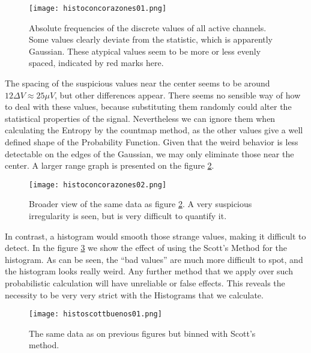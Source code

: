 \documentclass[10pt]{article}
\begin{document}
\begin{figure}
  \begin{center}
    \texttt{[image: histoconcorazones01.png]}
    \end{center}
 \caption{Absolute frequencies of the discrete values of all active channels.
   Some values clearly deviate from the statistic, which is apparently
   Gaussian. These atypical values seem to be more or less
   evenly spaced, indicated by red marks here.}\label{histocountmap1}
\end{figure}

The spacing of the suspicious values near the center seems to be
around $12 \Delta V \approx 25 \mu V$, but other differences appear.
There seems no sensible way of how to deal with these values, because
substituting them randomly could alter the statistical properties of the
signal. Nevertheless we can ignore them when calculating the Entropy
by the countmap method, as the other values give a well defined shape
of the Probability Function. Given that the weird behavior is less
detectable on the edges of the Gaussian, we may only eliminate those
near the center. A larger range graph is presented on the figure
\ref{histocountmap2}.


\begin{figure}
  \begin{center}
 \texttt{[image: histoconcorazones02.png]}   
  \end{center}
 
 \caption{Broader view of the same data as figure \ref{histocountmap2}.
   A very suspicious irregularity is seen, but is very difficult to
 quantify it.}
 \label{histocountmap2}   
\end{figure}

In contrast, a histogram would smooth those strange values, making it
difficult to detect. In the figure \ref{histoscott01} we show the
effect of using the Scott's Method for the histogram. As can be seen,
the ``bad values'' are much more difficult to spot, and the
histogram looks really weird. Any further method that we apply over such
probabilistic calculation will have unreliable or false effects. This reveals
the necessity to be very very strict with the Histograms that we calculate.

\begin{figure}
  \begin{center}
  \texttt{[image: histoscottbuenos01.png]}  
  \end{center}
    \caption{The same data as on previous figures but binned with Scott's method.}
  \label{histoscott01}
\end{figure}
\end{document}
